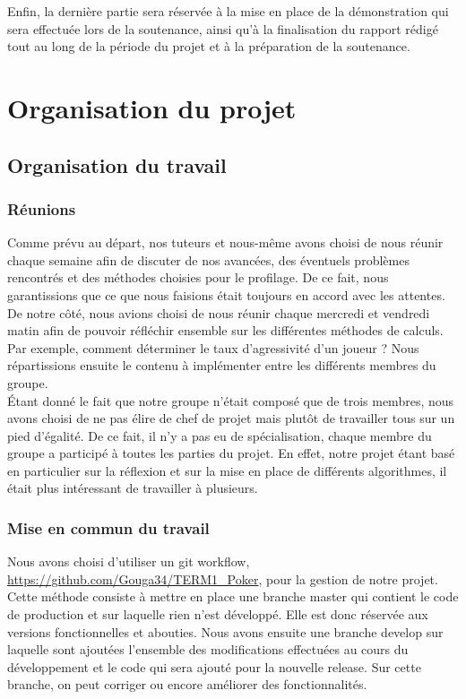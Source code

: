 \documentclass{report}
\begin{document}
Enfin, la dernière partie sera réservée à la mise en place de la démonstration qui sera effectuée lors de la soutenance, ainsi qu'à la finalisation du rapport rédigé tout au long de la période du projet et à la préparation de la soutenance.\par

\chapter{Organisation du projet}



\section{Organisation du travail}

\subsection{Réunions}
\hspace{0.5cm}Comme prévu au départ, nos tuteurs et nous-même avons choisi de nous réunir chaque semaine afin de discuter de nos avancées, des éventuels problèmes rencontrés et des méthodes choisies pour le profilage. De ce fait, nous garantissions que ce que nous faisions était toujours en accord avec les attentes.\\

De notre côté, nous avions choisi de nous réunir chaque mercredi et vendredi matin afin de pouvoir réfléchir ensemble sur les différentes méthodes de calculs. Par exemple, comment déterminer le taux d'agressivité d'un joueur ? Nous répartissions ensuite le contenu à implémenter entre les différents membres du groupe.\\

Étant donné le fait que notre groupe n'était composé que de trois membres, nous avons choisi de ne pas élire de chef de projet mais plutôt de travailler tous sur un pied d'égalité. De ce fait, il n'y a pas eu de spécialisation, chaque membre du groupe a participé à toutes les parties du projet. En effet, notre projet étant basé en particulier sur la réflexion et sur la mise en place de différents algorithmes, il était plus intéressant de travailler à plusieurs.\par

\subsection{Mise en commun du travail}
\hspace{0.5cm}Nous avons choisi d'utiliser un git workflow, \url{https://github.com/Gouga34/TERM1_Poker}, pour la gestion de notre projet. Cette méthode consiste à mettre en place une branche master qui contient le code de production et sur laquelle rien n'est développé. Elle est donc réservée aux versions fonctionnelles et abouties.
Nous avons ensuite une branche develop sur laquelle sont ajoutées l'ensemble des modifications effectuées au cours du développement et le code qui sera ajouté pour la nouvelle release. Sur cette branche, on peut corriger ou encore améliorer des fonctionnalités. \\
\end{document}
